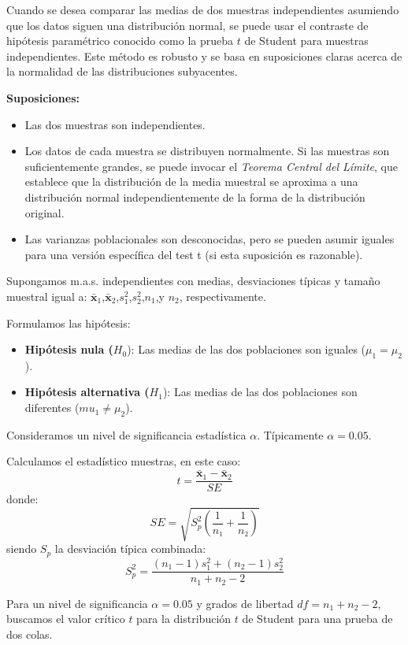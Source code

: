 \documentclass[
  letterpaper,
  DIV=11,
  numbers=noendperiod]{scrreprt}
\providecommand{\tightlist}{%
  \setlength{\itemsep}{0pt}\setlength{\parskip}{0pt}}\usepackage{longtable,booktabs,array}
\begin{document}
Cuando se desea comparar las medias de dos muestras independientes
asumiendo que los datos siguen una distribución normal, se puede usar el
contraste de hipótesis paramétrico conocido como la prueba \(t\) de
Student para muestras independientes. Este método es robusto y se basa
en suposiciones claras acerca de la normalidad de las distribuciones
subyacentes.

\textbf{Suposiciones:}

\begin{itemize}
\tightlist
\item
  Las dos muestras son independientes.
\item
  Los datos de cada muestra se distribuyen normalmente. Si las muestras
  son suficientemente grandes, se puede invocar el \emph{Teorema Central
  del Límite}, que establece que la distribución de la media muestral se
  aproxima a una distribución normal independientemente de la forma de
  la distribución original.
\item
  Las varianzas poblacionales son desconocidas, pero se pueden asumir
  iguales para una versión específica del test t (si esta suposición es
  razonable).
\end{itemize}

Supongamos m.a.s. independientes con medias, desviaciones típicas y
tamaño muestral igual a:
\(\bar{\mathbf{x}}_1\),\(\bar{\mathbf{x}}_2\),\(s_1^2\),\(s_2^2\),\(n_1\),y
\(n_2\), respectivamente.

Formulamos las hipótesis:

\begin{itemize}
\tightlist
\item
  \textbf{Hipótesis nula (}\(H_0\)): Las medias de las dos poblaciones
  son iguales (\(\mu_1=\mu_2\)).
\item
  \textbf{Hipótesis alternativa (}\(H_1\)): Las medias de las dos
  poblaciones son diferentes (\(mu_1 \neq \mu_2\)).
\end{itemize}

Consideramos un nivel de significancia estadística \(\alpha\).
Típicamente \(\alpha=0.05\).

Calculamos el estadístico muestras, en este caso: \[
t = \frac{\bar{\mathbf{x}}_1-\bar{\mathbf{x}}_2}{SE}
\] donde: \[
SE = \sqrt{S^2_p \left( \frac{1}{n₁} + \frac{1}{n₂} \right)}
\] siendo \(S_p\) la desviación típica combinada: \[
S^2_p= \frac{(n_1 - 1)s_1^2 + (n_2 - 1)s_2^2}{n_1 + n_2 - 2}
\]

Para un nivel de significancia \(\alpha= 0.05\) y grados de libertad
\(df = n_1+n_2-2\), buscamos el valor crítico \(t\) para la distribución
\(t\) de Student para una prueba de dos colas.
\end{document}
